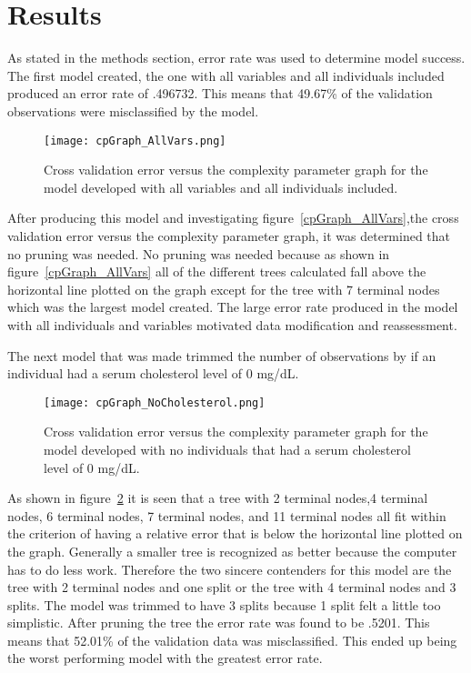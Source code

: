 \documentclass[12pt]{article}
\begin{document}
\section{Results}
\label{sec:resu}
As stated in the methods section, error rate was used to determine model success.
The first model created, the one with all variables and all individuals included produced an error rate of .496732. This means that 49.67\% of the validation observations were misclassified by the model. 
\begin{figure}[p]
  \centering
  \texttt{[image: cpGraph\_AllVars.png]}
  \caption{Cross validation error versus the complexity parameter graph for the model developed with all variables and all individuals included.}
  \label{fig:cpGraph_AllVars}
\end{figure}
After producing this model and investigating figure~\ref*{cpGraph_AllVars},the cross validation error versus the complexity parameter graph, it was determined that no pruning was needed. No pruning was needed because as shown in figure~\ref*{cpGraph_AllVars} all of the different trees calculated fall above the horizontal line plotted on the graph except for the tree with 7 terminal nodes which was the largest model created. The large error rate produced in the model with all individuals and variables motivated data modification and reassessment. \par
The next model that was made trimmed the number of observations by if an individual had a serum cholesterol level of 0 mg/dL. 
\begin{figure}[p]
  \centering
  \texttt{[image: cpGraph\_NoCholesterol.png]}
  \caption{Cross validation error versus the complexity parameter graph for the model developed with no individuals that had a serum cholesterol level of 0 mg/dL.}
  \label{fig:cpGraph_NoCholesterol}
\end{figure}
As shown in figure~\ref*{fig:cpGraph_NoCholesterol} it is seen that a tree with 2 terminal nodes,4 terminal nodes, 6 terminal nodes, 7 terminal nodes, and 11 terminal nodes all fit within the criterion of having a relative error that is below the horizontal line plotted on the graph. Generally a smaller tree is recognized as better because the computer has to do less work. Therefore the two sincere contenders for this model are the tree with 2 terminal nodes and one split or the tree with 4 terminal nodes and 3 splits. The model was trimmed to have 3 splits because 1 split felt a little too simplistic. After pruning the tree the error rate was found to be .5201. This means that 52.01\% of the validation data was misclassified. This ended up being the worst performing model with the greatest error rate. \par
\end{document}
